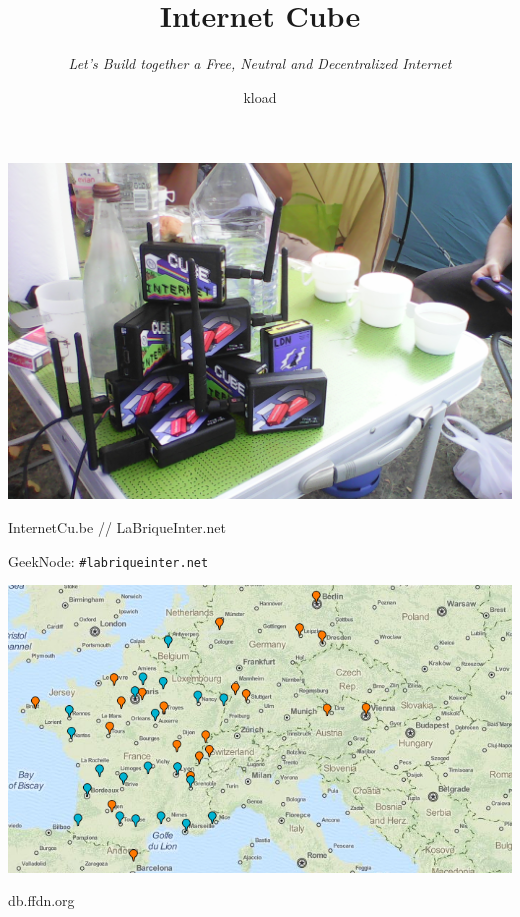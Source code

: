 \documentclass[notes=hide]{beamer}
\title{\Huge Internet Cube}
\subtitle{\vspace{.2cm}\emph{Let's Build together a Free, Neutral and Decentralized Internet}}
\institute{\textbf{CCCamp'15}}
\author{kload}
\begin{document}
\begin{frame}[t,plain]
\titlepage
\end{frame}

\begin{frame}[t,plain]
\begin{center}
  \vspace{\fill}
  \includegraphics[width=\textwidth]{img/lotofcubes.png}
  \vspace{\fill}
\end{center}
\end{frame}

\begin{frame}[t,plain]
\huge
\begin{center}
\vspace{\fill}
Internet{\color{red}Cu.be} // {\color{red}LaBrique}Inter.net

{\large GeekNode: \texttt{\#labriqueinter.net}}

\vspace{.4cm}
\includegraphics[width=.7\textwidth]{img/ffdnmap.png}

\vspace{\fill}
db.{\color{ffdncolor}ffdn.org}
\vspace{\fill}
\end{center}
\end{frame}
\end{document}
